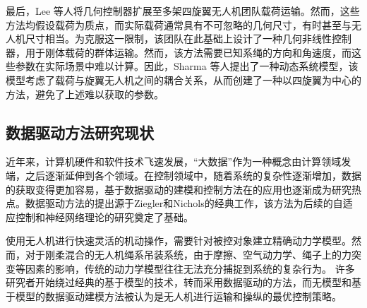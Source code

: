 \documentclass[lang=chs, degree=master, blindreview=true, winfonts=true]{yanputhesis}
\begin{document}
最后，Lee 等人\cite{lee2013geometric}将几何控制器扩展至多架四旋翼无人机团队载荷运输。然而，这些方法均假设载荷为质点，而实际载荷通常具有不可忽略的几何尺寸，有时甚至与无人机尺寸相当。为克服这一限制，该团队在此基础上设计了一种几何非线性控制器，用于刚体载荷的群体运输\cite{lee2017geometric}。然而，该方法需要已知系绳的方向和角速度，而这些参数在实际场景中难以计算。因此，Sharma 等人\cite{sharma2023geometric}提出了一种动态系统模型，该模型考虑了载荷与旋翼无人机之间的耦合关系，从而创建了一种以四旋翼为中心的方法，避免了上述难以获取的参数。





\subsection{数据驱动方法研究现状}
近年来，计算机硬件和软件技术飞速发展，“大数据”作为一种概念由计算领域发端，之后逐渐延伸到各个领域。在控制领域中，随着系统的复杂性逐渐增加，数据的获取变得更加容易，基于数据驱动的建模和控制方法在的应用也逐渐成为研究热点。数据驱动方法的提出源于Ziegler和Nichols的经典工作\cite{ziegler1942optimum}，该方法为后续的自适应控制\cite{wittenmark1989adaptive}和神经网络理论\cite{werbos1989neural}的研究奠定了基础。

使用无人机进行快速灵活的机动操作，需要针对被控对象建立精确动力学模型。然而，对于刚柔混合的无人机绳系吊装系统，由于摩擦、空气动力学、绳子上的力突变等因素的影响，传统的动力学模型往往无法充分捕捉到系统的复杂行为。
许多研究者开始绕过经典的基于模型的技术，转而采用数据驱动的方法\cite{hou2013model}，而无模型和基于模型的数据驱动建模方法被认为是无人机进行运输和操纵的最优控制策略。
\end{document}
